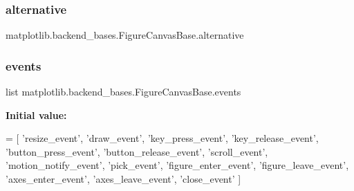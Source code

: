 \subsubsection{\texorpdfstring{alternative}{alternative}}
{\footnotesize\ttfamily matplotlib.\+backend\+\_\+bases.\+Figure\+Canvas\+Base.\+alternative\hspace{0.3cm}{\ttfamily [static]}}

\mbox{\label{classmatplotlib_1_1backend__bases_1_1FigureCanvasBase_a82c4936e4f0a667d8891eb6585b87578}} 
\subsubsection{\texorpdfstring{events}{events}}
{\footnotesize\ttfamily list matplotlib.\+backend\+\_\+bases.\+Figure\+Canvas\+Base.\+events\hspace{0.3cm}{\ttfamily [static]}}

{\bfseries Initial value\+:}
\begin{DoxyCode}
=  [
        \textcolor{stringliteral}{'resize\_event'},
        \textcolor{stringliteral}{'draw\_event'},
        \textcolor{stringliteral}{'key\_press\_event'},
        \textcolor{stringliteral}{'key\_release\_event'},
        \textcolor{stringliteral}{'button\_press\_event'},
        \textcolor{stringliteral}{'button\_release\_event'},
        \textcolor{stringliteral}{'scroll\_event'},
        \textcolor{stringliteral}{'motion\_notify\_event'},
        \textcolor{stringliteral}{'pick\_event'},
        \textcolor{stringliteral}{'figure\_enter\_event'},
        \textcolor{stringliteral}{'figure\_leave\_event'},
        \textcolor{stringliteral}{'axes\_enter\_event'},
        \textcolor{stringliteral}{'axes\_leave\_event'},
        \textcolor{stringliteral}{'close\_event'}
    ]
\end{DoxyCode}
\mbox{\label{classmatplotlib_1_1backend__bases_1_1FigureCanvasBase_aa5120a3253575aac5d0e280f5debcff7}} 
